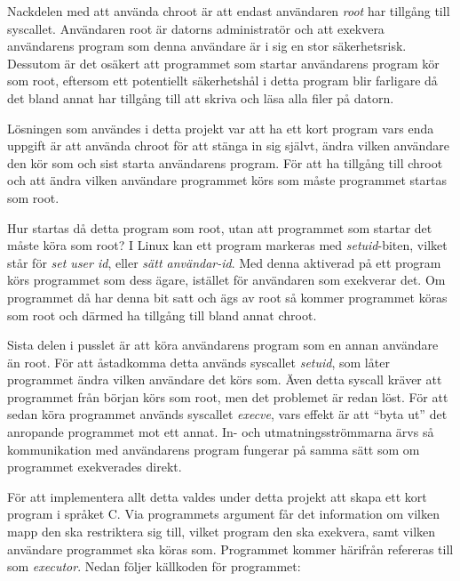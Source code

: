 \documentclass{article}
\begin{document}
Nackdelen med att använda chroot är att endast användaren \textit{root} har
tillgång till syscallet. Användaren root är datorns administratör och att
exekvera an\-vändarens program som denna användare är i sig en stor
säkerhetsrisk.  Dessutom är det osäkert att programmet som startar användarens
program kör som root, eftersom ett potentiellt säkerhetshål i detta program blir
farligare då det bland annat har tillgång till att skriva och läsa alla filer på
datorn.

Lösningen som användes i detta projekt var att ha ett kort program vars enda
uppgift är att använda chroot för att stänga in sig självt, ändra vilken
användare den kör som och sist starta användarens program. För att ha tillgång
till chroot och att ändra vilken användare programmet körs som måste programmet
startas som root.

Hur startas då detta program som root, utan att programmet som startar det måste
köra som root? I Linux kan ett program markeras med \textit{setuid}-biten,
vilket står för \textit{set user id}, eller \textit{sätt användar-id}. Med
denna aktiverad på ett program körs programmet som dess ägare, istället för
användaren som exekverar det. Om programmet då har denna bit satt och ägs av
root så kommer programmet köras som root och därmed ha tillgång till bland annat
chroot.

Sista delen i pusslet är att köra användarens program som en annan användare än
root. För att åstadkomma detta används syscallet \textit{setuid}, som låter
programmet ändra vilken användare det körs som. Även detta syscall kräver att
programmet från början körs som root, men det problemet är redan löst. För att
sedan köra programmet används syscallet \textit{execve}, vars effekt är att
``byta ut'' det anropande programmet mot ett annat. In- och utmatningsströmmarna
ärvs så kommunikation med användarens program fungerar på samma sätt som om
programmet exekverades direkt.

\hypertarget{executor}{}
\label{executor}

För att implementera allt detta valdes under detta projekt att skapa ett kort
program i språket C. Via programmets argument får det information om vilken mapp
den ska restriktera sig till, vilket program den ska exekvera, samt vilken
användare programmet ska köras som. Programmet kommer härifrån refereras till
som \textit{executor}. Nedan följer källkoden för programmet:
\end{document}
